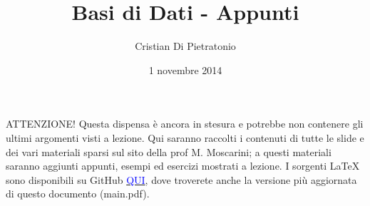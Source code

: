 \documentclass[a4paper,10pt]{article}
\title{\Huge Basi di Dati - Appunti}
\author{Cristian Di Pietratonio}
\date{1 novembre 2014}
\begin{document}
\maketitle

ATTENZIONE! Questa dispensa è ancora in stesura e potrebbe non contenere gli ultimi argomenti visti 
a lezione. Qui saranno raccolti i contenuti di tutte le slide e dei vari materiali sparsi sul sito
della prof M. Moscarini; a questi materiali saranno aggiunti appunti, esempi ed esercizi mostrati a
lezione. I sorgenti LaTeX sono disponibili su GitHub 
\href{https://github.com/Halolegend94/uni_database_appunti}{\textcolor{blue}{QUI}}, dove troverete anche la versione
più aggiornata di questo documento (main.pdf).

\newpage
\setcounter{tocdepth}{3}
\tableofcontents
\newpage

\newpage

\newpage

\newpage

\end{document}
